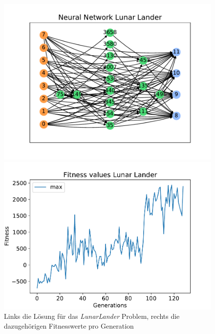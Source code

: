 \begin{figure}[!h]
	\centering
	\begin{minipage}[]{0.49\textwidth}
		\includegraphics[width=1.0\textwidth]{./img/lunar_lander/lunar_lander_network.pdf} 
	\end{minipage}
	\hfill
	\begin{minipage}[]{0.49\textwidth}
		\includegraphics[width=1.0\textwidth]{./img/lunar_lander/lunar_lander_fitness.pdf} 
	\end{minipage}
	\caption{Links die Lösung für das \emph{LunarLander} Problem, rechts die dazugehörigen Fitnesswerte pro Generation}
	\label{fig:lunar_lander_neural_network_and_fitness}
\end{figure}
